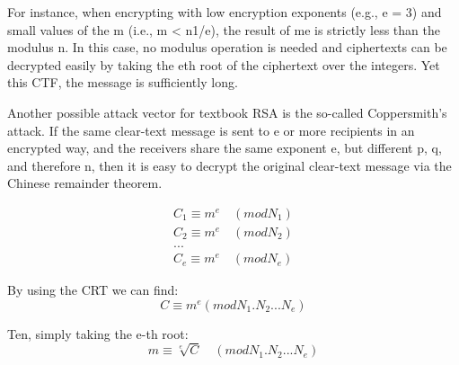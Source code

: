 \documentclass{article}
\begin{document}
\vspace{3mm}

For instance, when encrypting with low encryption exponents (e.g., e = 3) and small values of the m (i.e., m < n1/e), the result of me is strictly less than the modulus n. In this case, no modulus operation is needed and ciphertexts can be decrypted easily by taking the eth root of the ciphertext over the integers. Yet this CTF, the message is sufficiently long.

\vspace{3mm}

Another possible attack vector for textbook RSA is the so-called Coppersmith's attack. If the same clear-text message is sent to e or more recipients in an encrypted way, and the receivers share the same exponent e, but different p, q, and therefore n, then it is easy to decrypt the original clear-text message via the Chinese remainder theorem.

\begin{equation}
\begin{split}
    C_1 \equiv m^e \quad (mod N_1) \\
    C_2 \equiv m^e \quad (mod N_2) \\
    ... \\
    C_e \equiv m^e \quad (mod N_e)
\end{split}
\end{equation}

\vspace{3mm}
By using the CRT we can find:
\begin{equation}
 C \equiv m^e (mod N_1.N_2...N_e)
\end{equation}

\vspace{3mm}
Ten, simply taking the e-th root:
\begin{equation}
 m \equiv \sqrt[e]{C} \quad (mod N_1.N_2...N_e)
\end{equation}
\end{document}
